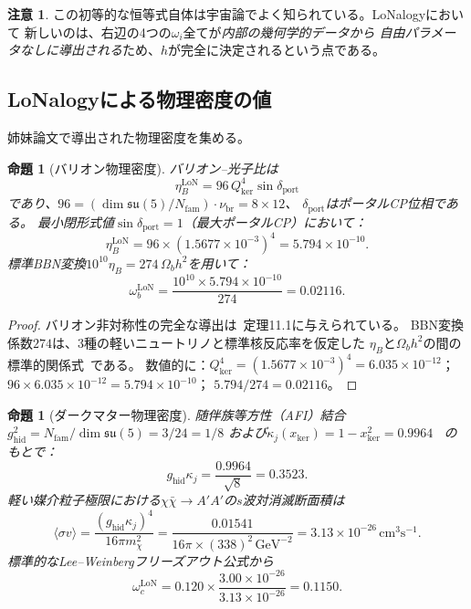 \documentclass[12pt]{article}
\theoremstyle{plain}
\newtheorem{proposition}[theorem]{命題}
\theoremstyle{definition}
\newtheorem{remark}[theorem]{注意}
\numberwithin{equation}{section}
\newcommand{\br}{\mathrm{br}}
\newcommand{\kker}{\mathrm{ker}}
\newcommand{\LoN}{\mathrm{LoN}}
\newcommand{\hid}{\mathrm{hid}}
\newcommand{\port}{\mathrm{port}}
\begin{document}
\begin{remark}
この初等的な恒等式自体は宇宙論でよく知られている。LoNalogyにおいて
新しいのは、右辺の4つの$\omega_i$全てが\emph{内部の幾何学的データから
自由パラメータなしに導出される}ため、$h$が完全に決定されるという点である。
\end{remark}


\subsection{LoNalogyによる物理密度の値}

姉妹論文で導出された物理密度を集める。

\begin{proposition}[バリオン物理密度]\label{prop:omegab}
バリオン--光子比は~\cite{ParticleCosmo}
\begin{equation}
\eta_B^{\LoN} = 96\,Q_{\kker}^4\sin\delta_{\port}
\end{equation}
であり、$96=(\dim\mathfrak{su}(5)/N_{\mathrm{fam}})\cdot\nu_{\br}=8\times12$、
$\delta_{\port}$はポータルCP位相である。
最小閉形式値$\sin\delta_{\port}=1$（最大ポータルCP）において：
\begin{equation}
\eta_B^{\LoN} = 96\times(1.5677\times10^{-3})^4 = 5.794\times10^{-10}.
\end{equation}
標準BBN変換$10^{10}\eta_B=274\,\Omega_b h^2$を用いて：
\begin{equation}\label{eq:omegab}
\boxed{\omega_b^{\LoN} = \frac{10^{10}\times5.794\times10^{-10}}{274} = 0.02116.}
\end{equation}
\end{proposition}

\begin{proof}
バリオン非対称性の完全な導出は~\cite{ParticleCosmo}定理11.1に与えられている。
BBN変換係数$274$は、3種の軽いニュートリノと標準核反応率を仮定した
$\eta_B$と$\Omega_b h^2$の間の標準的関係式~\cite{PDG2025}である。
数値的に：$Q_{\kker}^4=(1.5677\times10^{-3})^4=6.035\times10^{-12}$；
$96\times6.035\times10^{-12}=5.794\times10^{-10}$；
$5.794/274=0.02116$。
\end{proof}

\begin{proposition}[ダークマター物理密度]\label{prop:omegac}
随伴族等方性（AFI）結合
$g_{\hid}^2=N_{\mathrm{fam}}/\dim\mathfrak{su}(5)=3/24=1/8$
および$\kappa_j(x_{\kker})=1-x_{\kker}^2=0.9964$~\cite{ParticleCosmo}
のもとで：
\begin{equation}
g_{\hid}\kappa_j = \frac{0.9964}{\sqrt{8}} = 0.3523.
\end{equation}
軽い媒介粒子極限における$\chi\bar\chi\to A'A'$の$s$波対消滅断面積は
\begin{equation}
\langle\sigma v\rangle = \frac{(g_{\hid}\kappa_j)^4}{16\pi m_\chi^2}
= \frac{0.01541}{16\pi\times(338)^2\,\mathrm{GeV}^{-2}}
= 3.13\times10^{-26}\,\mathrm{cm}^3\mathrm{s}^{-1}.
\end{equation}
標準的なLee--Weinbergフリーズアウト公式から
\begin{equation}\label{eq:omegac}
\boxed{\omega_c^{\LoN} = 0.120\times\frac{3.00\times10^{-26}}{3.13\times10^{-26}} = 0.1150.}
\end{equation}
\end{proposition}
\end{document}
